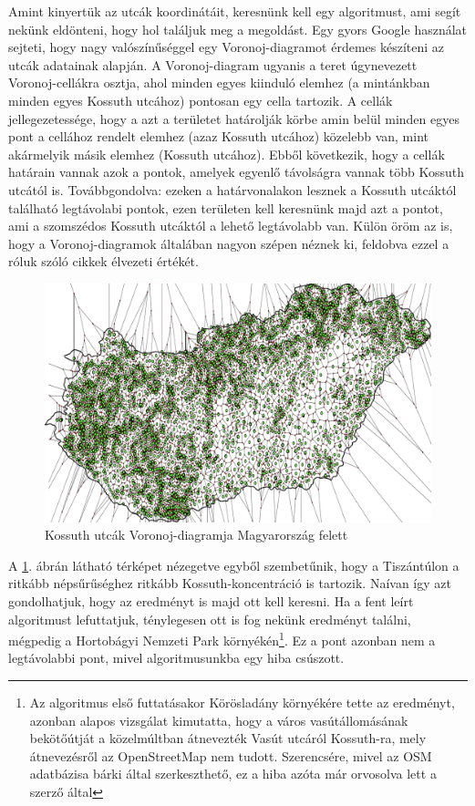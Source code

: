 \documentclass[a5paper,10pt]{article}
\begin{document}
Amint kinyertük az utcák koordinátáit, keresnünk kell egy algoritmust, ami segít nekünk eldönteni, hogy hol találjuk meg a megoldást. Egy gyors Google használat sejteti, hogy nagy valószínűséggel egy Voronoj-diagramot érdemes készíteni az utcák adatainak alapján\cite{voronoj}. A Voronoj-diagram ugyanis a teret úgynevezett Voronoj-cellákra osztja, ahol minden egyes kiinduló elemhez (a mintánkban minden egyes Kossuth utcához) pontosan egy cella tartozik. A cellák jellegezetessége, hogy a azt a területet határolják körbe amin belül minden egyes pont a cellához rendelt elemhez (azaz Kossuth utcához) közelebb van, mint akármelyik másik elemhez (Kossuth utcához). Ebből következik, hogy a cellák határain vannak azok a pontok, amelyek egyenlő távolságra vannak több Kossuth utcától is. Továbbgondolva: ezeken a határvonalakon lesznek a Kossuth utcáktól található legtávolabi pontok, ezen területen kell keresnünk majd azt a pontot, ami a szomszédos Kossuth utcáktól a lehető legtávolabb van. Külön öröm az is, hogy a Voronoj-diagramok általában nagyon szépen néznek ki, feldobva ezzel a róluk szóló cikkek élvezeti értékét.

\begin{figure}[!htbp]
    \centering
    \includegraphics[width=\textwidth]{images/hungary_voronoi.png}
    \caption{Kossuth utcák Voronoj-diagramja Magyarország felett}
    \label{voronoj:hun}
\end{figure}

A \ref{voronoj:hun}. ábrán látható térképet nézegetve egyből szembetűnik, hogy a Tiszántúlon a ritkább népsűrűséghez ritkább Kossuth-koncentráció is tartozik. Naívan így azt gondolhatjuk, hogy az eredményt is majd ott kell keresni. Ha a fent leírt algoritmust lefuttatjuk, ténylegesen ott is fog nekünk eredményt találni, mégpedig a Hortobágyi Nemzeti Park környékén\footnote{Az algoritmus első futtatásakor Körösladány környékére tette az eredményt, azonban alapos vizsgálat kimutatta, hogy a város vasútállomásának bekötőútját a közelmúltban átnevezték Vasút utcáról Kossuth-ra, mely átnevezésről az OpenStreetMap nem tudott. Szerencsére, mivel az OSM adatbázisa bárki által szerkeszthető, ez a hiba azóta már orvosolva lett a szerző által}. Ez a pont azonban nem a legtávolabbi pont, mivel algoritmusunkba egy hiba csúszott.
\end{document}
